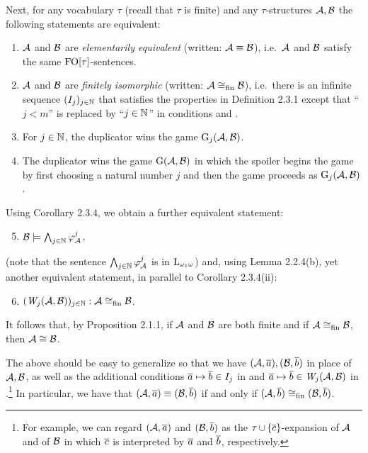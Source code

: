 \begin{enumerate}[1.]
Next, for any vocabulary $\tau$ (recall that $\tau$ is finite) and any $\tau$-structures $\mathcal{A}, \mathcal{B}$ the following statements are equivalent:
\begin{enumerate}[(1)]
\item $\mathcal{A}$ and $\mathcal{B}$ are \emph{elementarily equivalent} (written: $\mathcal{A} \equiv \mathcal{B}$), i.e.\ $\mathcal{A}$ and $\mathcal{B}$ satisfy the same $\folog\of{\tau}$-sentences.
\item $\mathcal{A}$ and $\mathcal{B}$ are \emph{finitely isomorphic} (written: $\mathcal{A} \cong_{\mathrm{fin}} \mathcal{B}$), i.e.\ there is an infinite sequence $(I_j)_{j \in \mathbb{N}}$ that satisfies the properties  in Definition 2.3.1 except that ``$j < m$'' is replaced by ``$j \in \mathbb{N}$'' in conditions  and .
\item For $j \in \mathbb{N}$, the duplicator wins the game $\game{j}(\strct{A}, \strct{B})$.
\item The duplicator wins the game $\mathrm{G}(\mathcal{A}, \mathcal{B})$ in which the spoiler begins the game by first choosing a natural number $j$ and then the game proceeds as $\game{j}(\strct{A}, \strct{B})$.
\end{enumerate}
Using Corollary 2.3.4, we obtain a further equivalent statement:
\begin{enumerate}[(1)]
\setcounter{enumii}{4}
\item $\mathcal{B} \models \bigwedge_{j \in \mathbb{N}} \varphi^{j}_{\mathcal{A}}$,
\end{enumerate}
(note that the sentence $\bigwedge_{j \in \mathbb{N}} \varphi^{j}_{\mathcal{A}}$ is in $\dlog{\omega_1}$) and, using Lemma 2.2.4(b), yet another equivalent statement, in parallel to Corollary 2.3.4(ii):
\begin{enumerate}[(1)]
\setcounter{enumii}{5}
\item $\seq{\winpos{j}(\strct{A}, \strct{B})}{j \in \nat} : \strct{A} \isom_\fin \strct{B}$.
\end{enumerate}
It follows that, by Proposition 2.1.1, if $\mathcal{A}$ and $\mathcal{B}$ are both finite and if $\mathcal{A} \cong_{\mathrm{fin}} \mathcal{B}$, then $\mathcal{A} \cong \mathcal{B}$.

The above should be easy to generalize so that we have $(\mathcal{A}, \overline{a}), (\mathcal{B}, \overline{b})$ in place of $\mathcal{A}, \mathcal{B}$, as well as the additional conditions $\overline{a} \mapsto \overline{b} \in I_j$ in  and $\vect{a} \mapsto \vect{b} \in \winpos{j}(\strct{A}, \strct{B})$ in .\footnote{For example, we can regard $(\mathcal{A}, \overline{a})$ and $(\mathcal{B}, \overline{b})$ as the $\tau \mathop{\cup} {\{\overline{c}\}}$-expansion of $\mathcal{A}$ and of $\mathcal{B}$ in which $\overline{c}$ is interpreted by $\overline{a}$ and $\overline{b}$, respectively.} In particular, we have that $(\mathcal{A}, \overline{a}) \equiv (\mathcal{B}, \overline{b})$ if and only if $(\mathcal{A}, \overline{b}) \cong_{\mathrm{fin}} (\mathcal{B}, \overline{b})$.


\end{enumerate}
